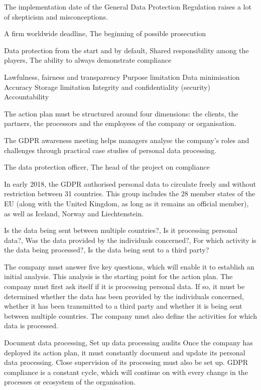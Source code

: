 \begin{itemize}
 \textbf{ }
The implementation date of the General Data Protection Regulation raises a lot of skepticism and misconceptions.

A firm worldwide deadline, The beginning of possible prosecution

Data protection from the start and by default, Shared responsibility among the players, The ability to always demonstrate compliance

Lawfulness, fairness and transparency
Purpose limitation
Data minimisation
Accuracy
Storage limitation
Integrity and confidentiality (security)
Accountability


The action plan must be structured around four dimensions: the clients, the partners, the processors and the employees of the company or organisation.

The GDPR awareness meeting helps managers analyse the company’s roles and challenges through practical case studies of personal data processing.

The data protection officer, The head of the project on compliance

In early 2018, the GDPR authorised personal data to circulate freely and without restriction between 31 countries. This group includes the 28 member states of the EU (along with the United Kingdom, as long as it remains an official member), as well as Iceland, Norway and Liechtenstein.


Is the data being sent between multiple countries?, Is it processing personal data?, Was the data provided by the individuals concerned?, For which activity is the data being processed?, Is the data being sent to a third party?


The company must answer five key questions, which will enable it to establish an initial analysis. This analysis is the starting point for the action plan. The company must first ask itself if it is processing personal data. If so, it must be determined whether the data has been provided by the individuals concerned, whether it has been transmitted to a third party and whether it is being sent between multiple countries. The company must also define the activities for which data is processed.


Document data processing, Set up data processing audits
Once the company has deployed its action plan, it must constantly document and update its personal data processing. Close supervision of its processing must also be set up. GDPR compliance is a constant cycle, which will continue on with every change in the processes or ecosystem of the organisation.


\end{itemize}
